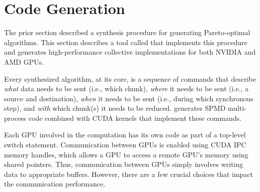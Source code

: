 \section{Code Generation}
\label{sec:lowering}
The prior section described a synthesis procedure for generating Pareto-optimal algorithms.
This section describes a tool called \tool{} that implements this procedure and generates 
high-performance collective implementations for both NVIDIA and AMD GPUs. 


Every synthesized algorithm, at its core, is a sequence of commands that
describe \emph{what} data needs to be sent (i.e., which chunk),
\emph{where} it needs to be sent (i.e., a source and destination),
\emph{when} it needs to be sent (i.e., during which synchronous step), and \emph{with} which chunk(s) it needs to be reduced. 
\tool{} generates SPMD multi-process \CC{} code combined with CUDA kernels that implement these commands. 

Each GPU involved in the computation has its own code as part of a top-level switch statement. Communication between GPUs is enabled using CUDA IPC
memory handles, which allows a GPU to access a remote GPU's memory using shared pointers. Thus, communication between GPUs simply involves 
writing data to appropriate buffers. However, there are a few crucial choices that impact the communication performance.   





